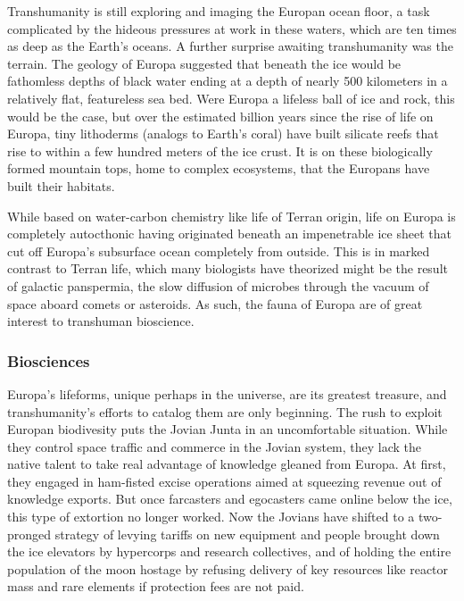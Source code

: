 Transhumanity is still exploring and imaging the 
Europan ocean floor, a task complicated by the hideous
pressures at work in these waters, which are ten
times as deep as the Earth's oceans. A further surprise 
awaiting transhumanity was the terrain. The geology 
of Europa suggested that beneath the ice would be 
fathomless depths of black water ending at a depth of 
nearly 500 kilometers in a relatively flat, featureless 
sea bed. Were Europa a lifeless ball of ice and rock, 
this would be the case, but over the estimated billion 
years since the rise of life on Europa, tiny lithoderms 
(analogs to Earth's coral) have built silicate reefs that 
rise to within a few hundred meters of the ice crust. It 
is on these biologically formed mountain tops, home 
to complex ecosystems, that the Europans have built 
their habitats.

While based on water-carbon chemistry like life 
of Terran origin, life on Europa is completely autocthonic
having originated beneath an impenetrable ice
sheet that cut off Europa's subsurface ocean completely
from outside. This is in marked contrast to Terran
life, which many biologists have theorized might be 
the result of galactic panspermia, the slow diffusion of 
microbes through the vacuum of space aboard comets 
or asteroids. As such, the fauna of Europa are of great 
interest to transhuman bioscience.

\subsubsection{Biosciences}

Europa's lifeforms, unique perhaps in the universe, 
are its greatest treasure, and transhumanity's efforts 
to catalog them are only beginning. The rush to exploit
Europan biodivesity puts the Jovian Junta in an
uncomfortable situation. While they control space 
traffic and commerce in the Jovian system, they lack 
the native talent to take real advantage of knowledge 
gleaned from Europa. At first, they engaged in ham-fisted
excise operations aimed at squeezing revenue
out of knowledge exports. But once farcasters and 
egocasters came online below the ice, this type of 
extortion no longer worked. Now the Jovians have 
shifted to a two-pronged strategy of levying tariffs 
on new equipment and people brought down the ice 
elevators by hypercorps and research collectives, and 
of holding the entire population of the moon hostage 
by refusing delivery of key resources like reactor mass 
and rare elements if protection fees are not paid.

